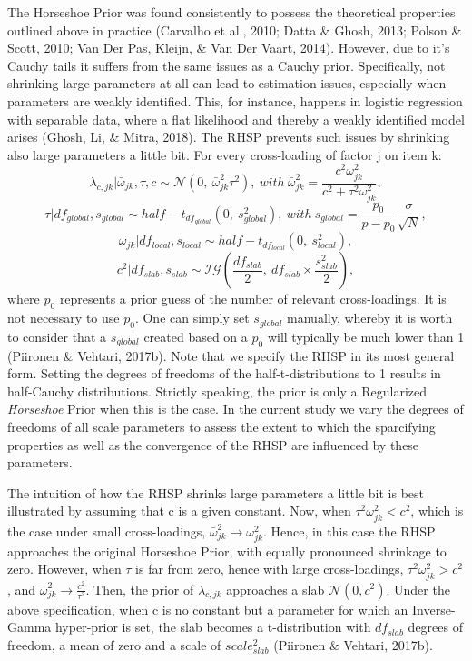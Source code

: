 \documentclass[
  man, donotrepeattitle,floatsintext]{apa6}
\begin{document}
The Horseshoe Prior was found consistently to possess the theoretical properties outlined above in practice (Carvalho et al., 2010; Datta \& Ghosh, 2013; Polson \& Scott, 2010; Van Der Pas, Kleijn, \& Van Der Vaart, 2014). However, due to it's Cauchy tails it suffers from the same issues as a Cauchy prior. Specifically, not shrinking large parameters at all can lead to estimation issues, especially when parameters are weakly identified. This, for instance, happens in logistic regression with separable data, where a flat likelihood and thereby a weakly identified model arises (Ghosh, Li, \& Mitra, 2018). The RHSP prevents such issues by shrinking also large parameters a little bit. For every cross-loading of factor j on item k:
\[\lambda_{c,jk} | \bar{\omega}_{jk}, \tau, c\sim \mathcal{N}(0, \ \bar{\omega}^2_{jk} \tau^2), \ with \ \bar{\omega}^2_{jk} = \frac{c^2\omega_{jk}^2}{c^2 + \tau^2 \omega_{jk}^2},\]
\[\tau | df_{global}, s_{global} \sim half-t_{df_{global}}(0,\  s_{global}^2), \ with \  s_{global} = \frac{p_0}{p-p_0}\frac{\sigma}{\sqrt{N}},\]
\[\omega_{jk}| df_{local}, s_{local} \sim half-t_{df_{local}}(0, \ s_{local}^2),\]
\[c^2 | df_{slab}, s_{slab} \sim \mathcal{IG}(\frac{df_{slab}}{2}, \  df_{slab} \times \frac{s_{slab}^2}{2}),\]
where \(p_0\) represents a prior guess of the number of relevant cross-loadings. It is not necessary to use \(p_0\). One can simply set \(s_{global}\) manually, whereby it is worth to consider that a \(s_{global}\) created based on a \(p_0\) will typically be much lower than 1 (Piironen \& Vehtari, 2017b). Note that we specify the RHSP in its most general form. Setting the degrees of freedoms of the half-t-distributions to 1 results in half-Cauchy distributions. Strictly speaking, the prior is only a Regularized \emph{Horseshoe} Prior when this is the case. In the current study we vary the degrees of freedoms of all scale parameters to assess the extent to which the sparcifying properties as well as the convergence of the RHSP are influenced by these parameters.

The intuition of how the RHSP shrinks large parameters a little bit is best illustrated by assuming that c is a given constant. Now, when \(\tau^2 \omega^2_{jk} < c^2\), which is the case under small cross-loadings, \(\bar{\omega}^2_{jk} \to \omega^2_{jk}\). Hence, in this case the RHSP approaches the original Horseshoe Prior, with equally pronounced shrinkage to zero. However, when \(\tau\) is far from zero, hence with large cross-loadings, \(\tau^2 \omega^2_{jk} > c^2\), and \(\bar{\omega}^2_{jk} \to \frac{c^2}{\tau^2}\). Then, the prior of \(\lambda_{c,jk}\) approaches a slab \(\mathcal{N}(0, c^2)\). Under the above specification, when c is no constant but a parameter for which an Inverse-Gamma hyper-prior is set, the slab becomes a t-distribution with \(df_{slab}\) degrees of freedom, a mean of zero and a scale of \(scale_{slab}^2\) (Piironen \& Vehtari, 2017b).
\end{document}
